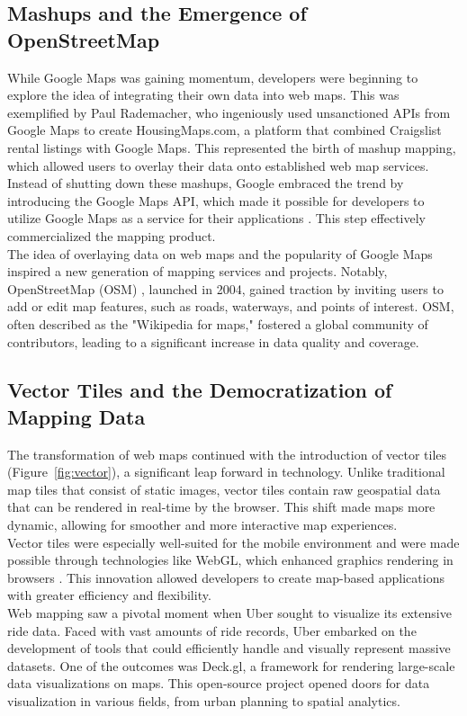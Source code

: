 \documentclass[10pt,oneside,english,a4paper]{article}
\begin{document}
\subsection{Mashups and the Emergence of OpenStreetMap} \label{history:mashups}
While Google Maps was gaining momentum, developers were beginning to explore the idea of integrating their own data into web maps. This was exemplified by Paul Rademacher, who ingeniously used unsanctioned APIs from Google Maps to create HousingMaps.com, a platform that combined Craigslist rental listings with Google Maps. This represented the birth of mashup mapping, which allowed users to overlay their data onto established web map services.
\\Instead of shutting down these mashups, Google embraced the trend by introducing the Google Maps API, which made it possible for developers to utilize Google Maps as a service for their applications \cite{Forrest2021}. This step effectively commercialized the mapping product.
\\The idea of overlaying data on web maps and the popularity of Google Maps inspired a new generation of mapping services and projects. Notably, OpenStreetMap (OSM) , launched in 2004, gained traction by inviting users to add or edit map features, such as roads, waterways, and points of interest. OSM, often described as the "Wikipedia for maps," fostered a global community of contributors, leading to a significant increase in data quality and coverage.

\subsection{Vector Tiles and the Democratization of Mapping Data} \label{history:vector}
The transformation of web maps continued with the introduction of vector tiles (Figure~\ref{fig:vector}), a significant leap forward in technology. Unlike traditional map tiles that consist of static images, vector tiles contain raw geospatial data that can be rendered in real-time by the browser. This shift made maps more dynamic, allowing for smoother and more interactive map experiences.
\\Vector tiles were especially well-suited for the mobile environment and were made possible through technologies like WebGL, which enhanced graphics rendering in browsers \cite{Forrest2021}. This innovation allowed developers to create map-based applications with greater efficiency and flexibility.
\\Web mapping saw a pivotal moment when Uber sought to visualize its extensive ride data. Faced with vast amounts of ride records, Uber embarked on the development of tools that could efficiently handle and visually represent massive datasets. One of the outcomes was Deck.gl, a framework for rendering large-scale data visualizations on maps. This open-source project opened doors for data visualization in various fields, from urban planning to spatial analytics.
\end{document}

